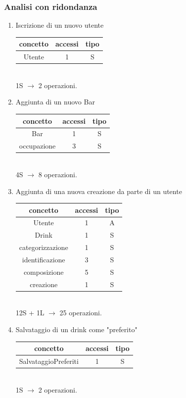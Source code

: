 \documentclass[a4paper,12pt]{report}
\begin{document}
\subsubsection{Analisi con ridondanza}
\begin{enumerate}
    \item Iscrizione di un nuovo utente\\
    \begin{tabular}{c|c|c}
    concetto & accessi & tipo\\
    \hline
        Utente & 1 & S\\
    \hline
    \end{tabular}
    \\1S $\to$ 2 operazioni.

    \item Aggiunta di un nuovo Bar\\
    \begin{tabular}{c|c|c}
    concetto & accessi & tipo\\
    \hline
        Bar & 1 & S\\
        occupazione & 3 & S\\
    \hline
    \end{tabular}
    \\4S $\to$ 8 operazioni.

    \item Aggiunta di una nuova creazione \footnotesize da parte di un utente\\ \normalsize
    \begin{tabular}{c|c|c}
    concetto & accessi & tipo\\
    \hline
        Utente & 1 & A\\
        Drink & 1 & S\\
        categorizzazione & 1 & S\\
        identificazione & 3 & S\\
        composizione & 5 & S\\
        creazione & 1 & S\\
    \hline
    \end{tabular}
    \\12S + 1L $\to$ 25 operazioni.

    \item Salvataggio di un drink come "preferito"\\
    \begin{tabular}{c|c|c}
    concetto & accessi & tipo\\
    \hline
        SalvataggioPreferiti & 1 & S\\
    \hline
    \end{tabular}
    \\1S $\to$ 2 operazioni.


\end{enumerate}
\end{document}

